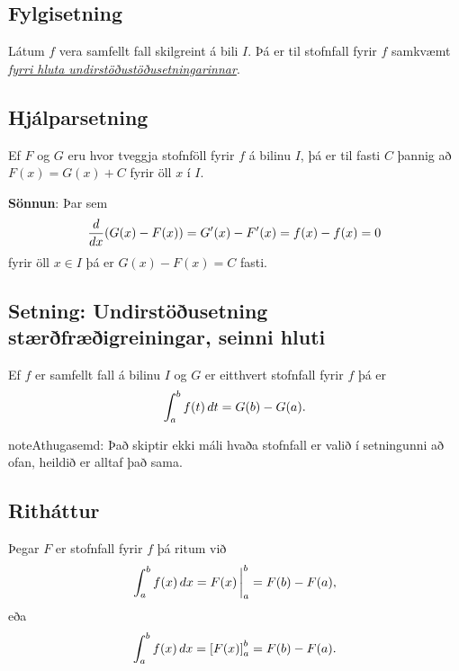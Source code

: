 \documentclass[b5paper,10pt,icelandic]{sphinxmanual}
\begin{document}
\subsection{Fylgisetning}
\label{kafli06:id8}
Látum \(f\) vera samfellt fall skilgreint á bili \(I\). Þá er
til stofnfall fyrir \(f\)
samkvæmt {\hyperref[kafli06:undirstodusetning\string-fyrri]{\emph{fyrri hluta undirstöðustöðusetningarinnar}}}.


\subsection{Hjálparsetning}
\label{kafli06:hjalparsetning}
Ef \(F\) og \(G\) eru hvor tveggja stofnföll fyrir \(f\) á
bilinu \(I\), þá er til fasti \(C\) þannig að
\(F(x)=G(x)+C\) fyrir öll \(x\) í \(I\).

\textbf{Sönnun}: Þar sem
\begin{gather}
\begin{split}\frac{d}{dx}(G(x) - F(x)) = G'(x) - F'(x) = f(x) - f(x) = 0\end{split}\notag
\end{gather}
fyrir öll \(x\in I\) þá er \(G(x)-F(x) = C\) fasti.


\subsection{Setning: Undirstöðusetning stærðfræðigreiningar, seinni hluti}
\label{kafli06:index-8}\label{kafli06:setning-undirstousetning-staerfraeigreiningar-seinni-hluti}
Ef \(f\) er samfellt fall á bilinu \(I\) og \(G\) er
eitthvert stofnfall fyrir \(f\) þá er
\begin{gather}
\begin{split}\int_a^b f(t)\,dt=G(b)-G(a).\end{split}\notag
\end{gather}
\begin{notice}{note}{Athugasemd:}
Það skiptir ekki máli hvaða stofnfall er valið í setningunni að ofan,
heildið er alltaf það sama.
\end{notice}


\subsection{Ritháttur}
\label{kafli06:rithattur}
Þegar \(F\) er stofnfall fyrir \(f\) þá ritum við
\begin{gather}
\begin{split}\int_a^b f(x)\,dx=F(x)\,\bigg|_a^b= F(b)-F(a),\end{split}\notag
\end{gather}
eða
\begin{gather}
\begin{split}\int_a^b f(x)\,dx=\left[F(x)\right]_a^b= F(b)-F(a).\end{split}\notag
\end{gather}
\end{document}

